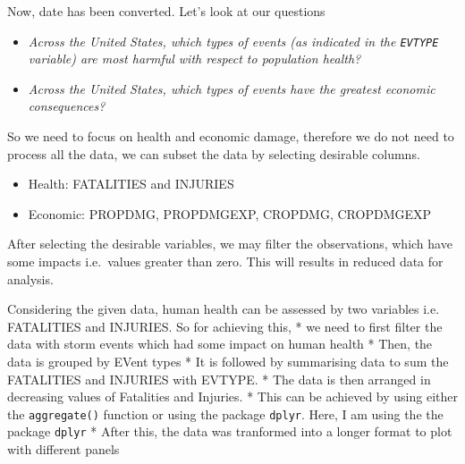 \documentclass[]{article}
\newenvironment{Shaded}{\begin{snugshade}}{\end{snugshade}}
\newcommand{\KeywordTok}[1]{\textcolor[rgb]{0.13,0.29,0.53}{\textbf{#1}}}
\newcommand{\StringTok}[1]{\textcolor[rgb]{0.31,0.60,0.02}{#1}}
\newcommand{\OperatorTok}[1]{\textcolor[rgb]{0.81,0.36,0.00}{\textbf{#1}}}
\newcommand{\NormalTok}[1]{#1}
\providecommand{\tightlist}{%
  \setlength{\itemsep}{0pt}\setlength{\parskip}{0pt}}
\begin{document}
Now, date has been converted. Let's look at our questions

\begin{itemize}
\item
  \emph{Across the United States, which types of events (as indicated in
  the \texttt{EVTYPE} variable) are most harmful with respect to
  population health?}
\item
  \emph{Across the United States, which types of events have the
  greatest economic consequences?}
\end{itemize}

So we need to focus on health and economic damage, therefore we do not
need to process all the data, we can subset the data by selecting
desirable columns.

\begin{itemize}
\tightlist
\item
  Health: FATALITIES and INJURIES
\item
  Economic: PROPDMG, PROPDMGEXP, CROPDMG, CROPDMGEXP
\end{itemize}

After selecting the desirable variables, we may filter the observations,
which have some impacts i.e.~values greater than zero. This will results
in reduced data for analysis.

\begin{Shaded}
\end{Shaded}

Considering the given data, human health can be assessed by two
variables i.e. FATALITIES and INJURIES. So for achieving this, * we need
to first filter the data with storm events which had some impact on
human health * Then, the data is grouped by EVent types * It is followed
by summarising data to sum the FATALITIES and INJURIES with EVTYPE. *
The data is then arranged in decreasing values of Fatalities and
Injuries. * This can be achieved by using either the
\texttt{aggregate()} function or using the package \texttt{dplyr}. Here,
I am using the the package \texttt{dplyr} * After this, the data was
tranformed into a longer format to plot with different panels
\end{document}
